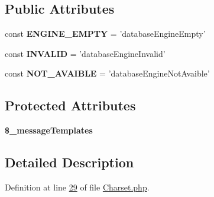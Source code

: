 \subsection*{Public Attributes}
\begin{DoxyCompactItemize}
\item 
\hypertarget{classZendDbSchema__Validate__Db__Schema__Database__Mysql__Charset_a9eed69c596bfc64cd097e324feed5d7c}{const {\bfseries E\-N\-G\-I\-N\-E\-\_\-\-E\-M\-P\-T\-Y} = 'database\-Engine\-Empty'}\label{classZendDbSchema__Validate__Db__Schema__Database__Mysql__Charset_a9eed69c596bfc64cd097e324feed5d7c}

\item 
\hypertarget{classZendDbSchema__Validate__Db__Schema__Database__Mysql__Charset_a2d4a7fedcb35dc3907ce59dd9fff8add}{const {\bfseries I\-N\-V\-A\-L\-I\-D} = 'database\-Engine\-Invalid'}\label{classZendDbSchema__Validate__Db__Schema__Database__Mysql__Charset_a2d4a7fedcb35dc3907ce59dd9fff8add}

\item 
\hypertarget{classZendDbSchema__Validate__Db__Schema__Database__Mysql__Charset_a7390efe7fbdd4c32fb802bce51c8f07c}{const {\bfseries N\-O\-T\-\_\-\-A\-V\-A\-I\-B\-L\-E} = 'database\-Engine\-Not\-Avaible'}\label{classZendDbSchema__Validate__Db__Schema__Database__Mysql__Charset_a7390efe7fbdd4c32fb802bce51c8f07c}

\end{DoxyCompactItemize}
\subsection*{Protected Attributes}
\begin{DoxyCompactItemize}
\item 
{\bfseries \$\-\_\-message\-Templates}
\end{DoxyCompactItemize}


\subsection{Detailed Description}


Definition at line \hyperlink{Charset_8php_source_l00029}{29} of file \hyperlink{Charset_8php_source}{Charset.\-php}.



